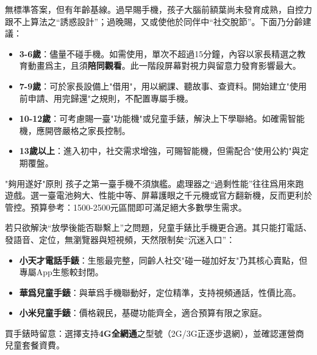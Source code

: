 


無標準答案，但有年齡基線。過早賜手機，孩子大腦前額葉尚未發育成熟，自控力跟不上算法之“誘惑設計”；過晚賜，又或使他於同伴中“社交脫節”。下面乃分齡建議：

\begin{itemize}
  \item \textbf{3-6歲}：儘量不碰手機。如需使用，單次不超過15分鐘，內容以家長精選之教育動畫爲主，且須\textbf{陪同觀看}。此一階段屏幕對視力與留意力發育影響最大。
  \item \textbf{7-9歲}：可於家長設備上"借用"，用以網課、聽故事、查資料。開始建立"使用前申請、用完歸還"之規則，不配置專屬手機。
  \item \textbf{10-12歲}：可考慮賜一臺"功能機"或兒童手錶，解決上下學聯絡。如確需智能機，應開啓嚴格之家長控制。
  \item \textbf{13歲以上}：進入初中，社交需求增強，可賜智能機，但需配合"使用公約"與定期覆盤。
\end{itemize}

\begin{tcbinfo}{"夠用遂好"原則}
孩子之第一臺手機不須旗艦。處理器之“過剩性能”往往爲用來跑遊戲。選一臺電池夠大、性能中等、屏幕護眼之千元機或官方翻新機，反而更利於管控。預算參考：1500-2500元區間即可滿足絕大多數學生需求。

\end{tcbinfo}


若只欲解決“放學後能否聯繫上”之問題，兒童手錶比手機更合適。其只能打電話、發語音、定位，無瀏覽器與短視頻，天然限制矣“沉迷入口”：

\begin{itemize}
  \item \textbf{小天才電話手錶}：生態最完整，同齡人社交"碰一碰加好友"乃其核心賣點，但專屬App生態較封閉。
  \item \textbf{華爲兒童手錶}：與華爲手機聯動好，定位精準，支持視頻通話，性價比高。
  \item \textbf{小米兒童手錶}：價格親民，基礎功能齊全，適合預算有限之家庭。
\end{itemize}

買手錶時留意：選擇支持\textbf{4G全網通}之型號（2G/3G正逐步退網），並確認運營商兒童套餐資費。

